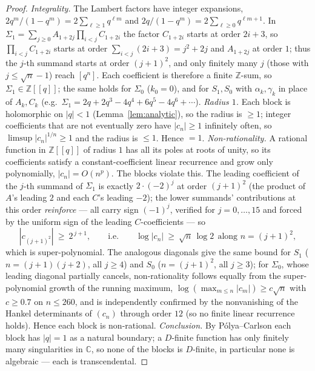 \begin{proof}
\emph{Integrality.} The Lambert factors have integer expansions,
$2q^{m}/(1-q^{m})=2\sum_{\ell\ge1}q^{\ell m}$ and
$2q/(1-q^{m})=2\sum_{\ell\ge0}q^{\ell m+1}$. In $\Sigma_1=\sum_{j\ge0}A_{1+2j}
\prod_{i<j}C_{1+2i}$ the factor $C_{1+2i}$ starts at order $2i+3$, so
$\prod_{i<j}C_{1+2i}$ starts at order $\sum_{i<j}(2i+3)=j^{2}+2j$ and $A_{1+2j}$ at
order $1$; thus the $j$-th summand starts at order $(j+1)^{2}$, and only finitely many
$j$ (those with $j\le\sqrt n-1$) reach $[q^n]$. Each coefficient is therefore a finite
$\mathbb Z$-sum, so $\Sigma_1\in\mathbb Z[[q]]$; the same holds for $\Sigma_0$ ($k_0=0$),
and for $S_1,S_0$ with $\alpha_k,\gamma_k$ in place of $A_k,C_k$ (e.g.\
$\Sigma_1=2q+2q^{3}-4q^{4}+6q^{5}-4q^{6}+\cdots$).
\emph{Radius $1$.} Each block is holomorphic on $|q|<1$ (Lemma~\ref{lem:analytic}), so
the radius is $\ge1$; integer coefficients that are not eventually zero have $|c_n|\ge1$
infinitely often, so $\limsup|c_n|^{1/n}\ge1$ and the radius is $\le1$. Hence $=1$.
\emph{Non-rationality.} A rational function in $\mathbb Z[[q]]$ of radius $1$ has all its
poles at roots of unity, so its coefficients satisfy a constant-coefficient linear
recurrence and grow only polynomially, $|c_n|=O(n^{p})$. The blocks violate this. The
leading coefficient of the $j$-th summand of $\Sigma_1$ is exactly $2\cdot(-2)^{j}$ at
order $(j+1)^{2}$ (the product of $A$'s leading $2$ and each $C$'s leading $-2$); the
lower summands' contributions at this order \emph{reinforce} --- all carry sign
$(-1)^{j}$, verified for $j=0,\dots,15$ and forced by the uniform sign of the leading
$C$-coefficients --- so
\[
  |c_{(j+1)^{2}}|\ \ge\ 2^{\,j+1},\qquad\text{i.e.}\qquad
  \log|c_n|\ \ge\ \sqrt n\,\log 2\ \ \text{along } n=(j+1)^{2},
\]
which is super-polynomial. The analogous diagonals give the same bound for $S_1$
($n=(j+1)(j+2)$, all $j\ge4$) and $S_0$ ($n=(j+1)^{2}$, all $j\ge3$); for $\Sigma_0$,
whose leading diagonal partially cancels, non-rationality follows equally from the
super-polynomial growth of the running maximum, $\log(\max_{m\le n}|c_m|)\ge c\sqrt n$
with $c\ge0.7$ on $n\le260$, and is independently confirmed by the nonvanishing of the
Hankel determinants of $(c_n)$ through order $12$ (so no finite linear recurrence holds).
Hence each block is non-rational.
\emph{Conclusion.} By P\'olya--Carlson each block has $|q|=1$ as a natural boundary; a
$D$-finite function has only finitely many singularities in $\mathbb C$, so none of the
blocks is $D$-finite, in particular none is algebraic --- each is transcendental.
\end{proof}

